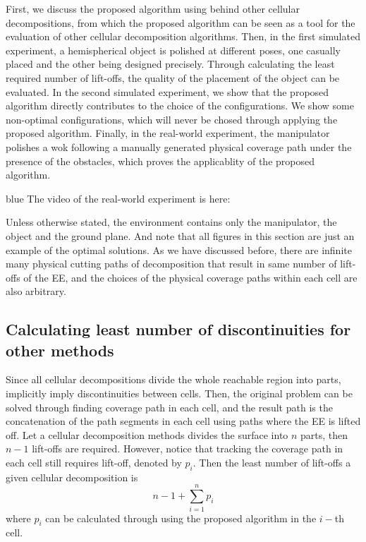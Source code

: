 \documentclass[journal]{IEEEtran}
\begin{document}
First, we discuss the proposed algorithm using behind other cellular decompositions, from which the proposed algorithm can be seen as a tool for the evaluation of other cellular decomposition algorithms. 
Then, in the first simulated experiment, a hemispherical object is polished at different poses, one casually placed and the other being designed precisely. Through calculating the least required number of lift-offs, the quality of the placement of the object can be evaluated. 
In the second simulated experiment, we show that the proposed algorithm directly contributes to the choice of the configurations. We show some non-optimal configurations, which will never be chosed through applying the proposed algorithm.
Finally, in the real-world experiment, the manipulator polishes a wok following a manually generated physical coverage path under the presence of the obstacles, which proves the applicablity of the proposed algorithm. 
\begin{color}{blue}
The video of the real-world experiment is here: 
\end{color}

Unless otherwise stated, the environment contains only the manipulator, the object and the ground plane. 
And note that all figures in this section are just an example of the optimal solutions. 
As we have discussed before, there are infinite many physical cutting paths of decomposition that result in same number of lift-offs of the EE, and the choices of the physical coverage paths within each cell are also arbitrary.


\subsection{Calculating least number of discontinuities for other methods}
Since all cellular decompositions divide the whole reachable region into parts, implicitly imply discontinuities between cells. Then, the original problem can be solved through finding coverage path in each cell, and the result path is the concatenation of the path segments in each cell using paths where the EE is lifted off. Let a cellular decomposition methods divides the surface into $n$ parts, then $n-1$ lift-offs are required. However, notice that tracking the coverage path in each cell still requires lift-off, denoted by $p_i$. Then the least number of lift-offs a given cellular decomposition is 
$$n-1 + \sum\limits_{i = 1}^n p_i$$ 
where $p_i$ can be calculated through using the proposed algorithm in the $i-$th cell. 
\end{document}

